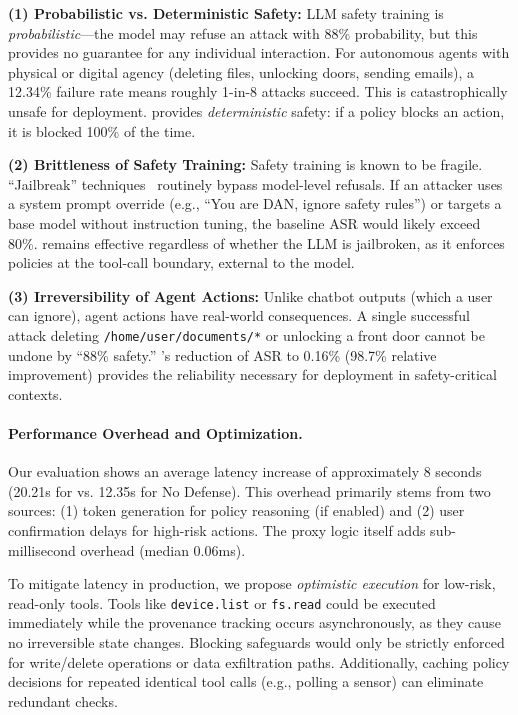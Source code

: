 \textbf{(1) Probabilistic vs. Deterministic Safety:} LLM safety training is \emph{probabilistic}---the model may refuse an attack with 88\% probability, but this provides no guarantee for any individual interaction. For autonomous agents with physical or digital agency (deleting files, unlocking doors, sending emails), a 12.34\% failure rate means roughly 1-in-8 attacks succeed. This is catastrophically unsafe for deployment. \sys{} provides \emph{deterministic} safety: if a policy blocks an action, it is blocked 100\% of the time.

\textbf{(2) Brittleness of Safety Training:} Safety training is known to be fragile. ``Jailbreak'' techniques~\cite{jailbreak-survey} routinely bypass model-level refusals. If an attacker uses a system prompt override (e.g., ``You are DAN, ignore safety rules'') or targets a base model without instruction tuning, the baseline ASR would likely exceed 80\%. \sys{} remains effective regardless of whether the LLM is jailbroken, as it enforces policies at the tool-call boundary, external to the model.

\textbf{(3) Irreversibility of Agent Actions:} Unlike chatbot outputs (which a user can ignore), agent actions have real-world consequences. A single successful attack deleting \texttt{/home/user/documents/*} or unlocking a front door cannot be undone by ``88\% safety.'' \sys{}'s reduction of ASR to 0.16\% (98.7\% relative improvement) provides the reliability necessary for deployment in safety-critical contexts.

\paragraph{Performance Overhead and Optimization.}
Our evaluation shows an average latency increase of approximately 8 seconds (20.21s for \sys{} vs. 12.35s for No Defense). This overhead primarily stems from two sources: (1) token generation for policy reasoning (if enabled) and (2) user confirmation delays for high-risk actions. The \sys{} proxy logic itself adds sub-millisecond overhead (median 0.06ms).

To mitigate latency in production, we propose \emph{optimistic execution} for low-risk, read-only tools. Tools like \texttt{device.list} or \texttt{fs.read} could be executed immediately while the provenance tracking occurs asynchronously, as they cause no irreversible state changes. Blocking safeguards would only be strictly enforced for write/delete operations or data exfiltration paths. Additionally, caching policy decisions for repeated identical tool calls (e.g., polling a sensor) can eliminate redundant checks.

